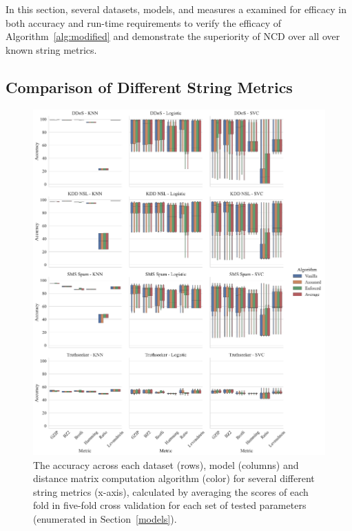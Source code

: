 \documentclass[preprint,12pt]{elsarticle}
\begin{document}
In this section, several datasets, models, and measures a examined for efficacy in both accuracy and run-time requirements to verify the efficacy of Algorithm~\ref{alg:modified} and demonstrate the superiority of NCD over all over known string metrics.



\subsection{Comparison of Different String Metrics}

\begin{figure}
    \centering
    \includegraphics[width=\textwidth]{images/accuracy_vs_algorithm.pdf}
    \caption{The accuracy across each dataset (rows), model (columns) and distance matrix computation algorithm (color) for several different string metrics (x-axis), calculated by averaging the scores of each fold in five-fold cross validation for each set of tested parameters (enumerated in Section~\ref{models}).}
    \label{fig:metric_acc}
\end{figure}
\end{document}
